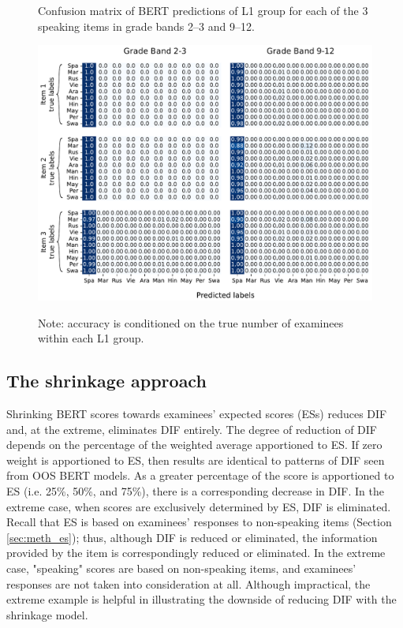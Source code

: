 \documentclass [PhD] {uclathes}
\begin{document}
\begin{figure}[!htb]
    \centering
    \caption{Confusion matrix of BERT predictions of L1 group for each of the 3 speaking items in grade bands 2–3 and 9–12.}    
    \includegraphics[width=6.5in]{figures/20230516_language805_heatmap_edit.pdf}
    \label{heatmap_lang}
\caption*{\small Note: accuracy is conditioned on the true number of examinees within each L1 group.}

\end{figure}

\subsection{The shrinkage approach}

Shrinking BERT scores towards examinees’ expected scores (ESs) reduces DIF and, at the extreme, eliminates DIF entirely. The degree of reduction of DIF depends on the percentage of the weighted average apportioned to ES. If zero weight is apportioned to ES, then results are identical to patterns of DIF seen from OOS BERT models. As a greater percentage of the score is apportioned to ES (i.e. 25\%, 50\%, and 75\%), there is a corresponding decrease in DIF. In the extreme case, when scores are exclusively determined by ES, DIF is eliminated. Recall that ES is based on examinees’ responses to non-speaking items (Section \ref{sec:meth_es}); thus, although DIF is reduced or eliminated, the information provided by the item is correspondingly reduced or eliminated. In the extreme case, "speaking" scores are based on non-speaking items, and examinees’ responses are not taken into consideration at all. Although impractical, the extreme example is helpful in illustrating the downside of reducing DIF with the shrinkage model. 
\end{document}

